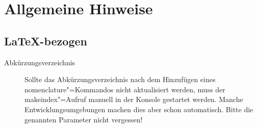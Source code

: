 %
%
%
%

\chapter{Allgemeine Hinweise}
\section{\LaTeX-bezogen}
\begin{description}
\item[Abkürzungsverzeichnis]
      Sollte das Abkürzungsverzeichnis nach dem Hinzufügen eines
      {\ttfamily nomenclature}"=Kommandos nicht aktualisiert werden,
      muss der {\ttfamily makeindex}"=Aufruf
      manuell in der Konsole gestartet werden. Manche
      Entwicklungsumgebungen machen dies aber schon automatisch.
      Bitte die genannten Parameter nicht vergessen!


\end{description}
